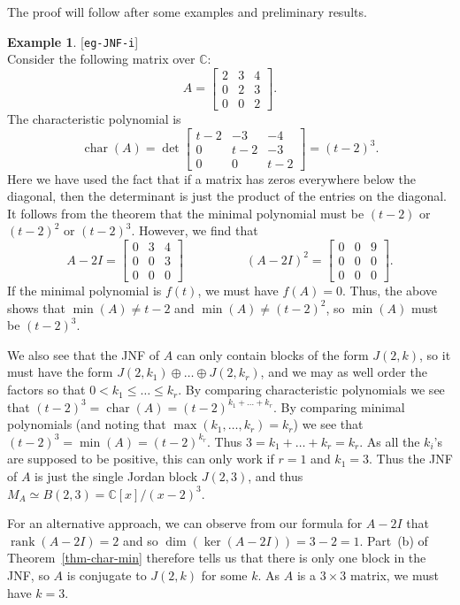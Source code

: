 \documentclass{amsart}
\newcommand{\lbl}[1]{\label{#1}\textup{[\texttt{#1}]}\ \\}
\newcommand{\lbl}{\label}
\newcommand{\bbm}       {\left[\begin{matrix}}
\newcommand{\ebm}       {\end{matrix}\right]}
\newcommand{\chr}       {\operatorname{char}}
\newcommand{\rank}      {\operatorname{rank}}
\newcommand{\C}         {{\mathbb{C}}}
\newcommand{\tm}        {\times}
\newcommand{\op}        {\oplus}
\renewcommand{\:}{\colon}
\theoremstyle{definition}
\newtheorem{example}[theorem]{Example}
\begin{document}
The proof will follow after some examples and preliminary results.
\begin{example}\lbl{eg-JNF-i}
 Consider the following matrix over $\C$:
 \[ A = \bbm 2&3&4\\0&2&3\\0&0&2 \ebm. \]
 The characteristic polynomial is 
 \[ \chr(A) = \det\bbm t-2&-3&-4 \\ 0&t-2&-3 \\ 0&0&t-2 \ebm 
            = (t-2)^3.
 \]
 Here we have used the fact that if a matrix has zeros everywhere
 below the diagonal, then the determinant is just the product of the
 entries on the diagonal.  It follows from the theorem that the
 minimal polynomial must be $(t-2)$ or $(t-2)^2$ or $(t-2)^3$.
 However, we find that 
 \[ A-2I     = \bbm 0&3&4\\0&0&3\\0&0&0\ebm \hspace{5em}
    (A-2I)^2 = \bbm 0&0&9\\0&0&0\\0&0&0\ebm.
 \]
 If the minimal polynomial is $f(t)$, we must have $f(A)=0$.  Thus,
 the above shows that $\min(A)\neq t-2$ and $\min(A)\neq(t-2)^2$, so
 $\min(A)$ must be $(t-2)^3$.

 We also see that the JNF of $A$ can only contain blocks of the form
 $J(2,k)$, so it must have the form $J(2,k_1)\op\ldots\op J(2,k_r)$,
 and we may as well order the factors so that $0<k_1\leq\ldots\leq
 k_r$.  By comparing characteristic polynomials we see that
 $(t-2)^3=\chr(A)=(t-2)^{k_1+\ldots+k_r}$.  By comparing minimal
 polynomials (and noting that $\max(k_1,\ldots,k_r)=k_r$) we see that
 $(t-2)^3=\min(A)=(t-2)^{k_r}$.  Thus $3=k_1+\ldots+k_r=k_r$.  As all
 the $k_i$'s are supposed to be positive, this can only work if $r=1$
 and $k_1=3$.  Thus the JNF of $A$ is just the single Jordan block
 $J(2,3)$, and thus $M_A\simeq B(2,3)=\C[x]/(x-2)^3$.

 For an alternative approach, we can observe from our formula for
 $A-2I$ that $\rank(A-2I)=2$ and so $\dim(\ker(A-2I))=3-2=1$.
 Part~(b) of Theorem~\ref{thm-char-min} therefore tells us that there
 is only one block in the JNF, so $A$ is conjugate to $J(2,k)$ for
 some $k$.  As $A$ is a $3\tm 3$ matrix, we must have $k=3$.
\end{example}
\end{document}
